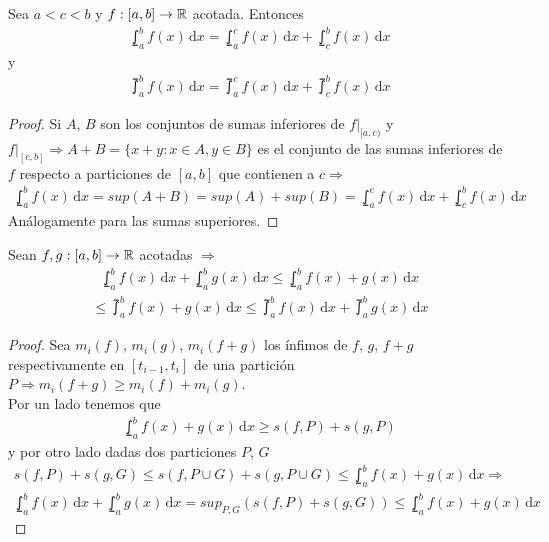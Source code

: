 \begin{theorem}
  Sea $a < c < b$ y $f: [a, b] \to \mathbb{R}$ acotada. Entonces \begin{align*}
    \lowint_a^b f(x)\,\mathrm{d}x = \lowint_a^c f(x)\,\mathrm{d}x + \lowint_c^b f(x)\,\mathrm{d}x
  \end{align*} y \begin{align*}
    \upint_a^b f(x)\, \mathrm{d}x = \upint_a^c f(x)\, \mathrm{d}x + \upint_c^b f(x)\, \mathrm{d}x
  \end{align*}

  \begin{proof}
    Si $A$, $B$ son los conjuntos de sumas inferiores de $f|_{[a, c)}$ y $f|_{[c, b]} \Rightarrow A + B = \{ x+y : x \in A, y \in B \}$ es el conjunto de las sumas inferiores de $f$ respecto a particiones
    de $[a, b]$ que contienen a $c \Rightarrow$ \begin{align*}
      \lowint_a^b f(x)\,\mathrm{d}x = sup(A+B) = sup(A) + sup(B) = \lowint_a^c f(x)\,\mathrm{d}x + \lowint_c^b f(x)\,\mathrm{d}x
    \end{align*}
    Análogamente para las sumas superiores.
  \end{proof}
\end{theorem}

\begin{prop}
  Sean $f, g: [a, b] \to \mathbb{R}$ acotadas $\Rightarrow$
  \begin{align*}
    \lowint_a^b f(x)\,\mathrm{d}x + \lowint_a^b g(x)\,\mathrm{d}x \leq \lowint_a^b f(x)+g(x)\,\mathrm{d}x
  \end{align*}
  \begin{align*}
    \leq \upint_a^b f(x) + g(x)\, \mathrm{d}x \leq \upint_a^b f(x)\, \mathrm{d}x + \upint_a^b g(x)\, \mathrm{d}x
  \end{align*}
  \begin{proof}
    Sea $m_i(f)$, $m_i(g)$, $m_i(f+g)$ los ínfimos de $f$, $g$, $f+g$ respectivamente en $[t_{i-1}, t_i]$ de una partición $P \Rightarrow m_i(f+g) \geq m_i(f) + m_i(g)$. \\
    Por un lado tenemos que \begin{align*}
      \lowint_a^b f(x)+g(x)\, \mathrm{d}x \geq s(f, P) + s(g, P)
    \end{align*} y por otro lado dadas dos particiones $P$, $G$ \begin{align*}
      s(f, P) + s(g, G) \leq s(f, P \cup G) + s(g, P \cup G) \leq \lowint_a^b f(x)+g(x)\,\mathrm{d}x \Rightarrow
    \end{align*}
    \begin{align*}
      \lowint_a^b f(x) \, \mathrm{d}x + \lowint_a^b g(x) \, \mathrm{d}x = sup_{P, G}(s(f, P)+s(g, G)) \leq \lowint_a^b f(x) + g(x)\, \mathrm{d}x
    \end{align*}
  \end{proof}
\end{prop}

